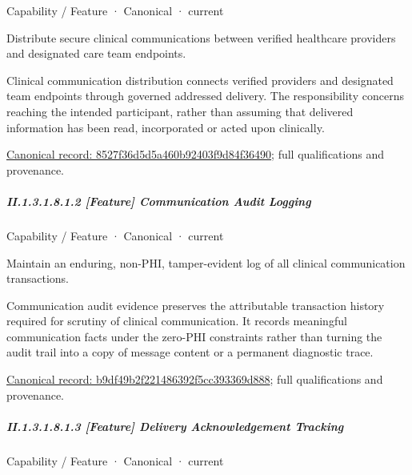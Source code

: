 \label{element:8527f36d5d5a460b92403f9d84f36490}
{\small Capability / Feature · Canonical · current}\par

Distribute secure clinical communications between verified healthcare providers and designated care team endpoints.



Clinical communication distribution connects verified providers and designated team endpoints through governed addressed delivery. The responsibility concerns reaching the intended participant, rather than assuming that delivered information has been read, incorporated or acted upon clinically.


{\footnotesize \href{../../../../continuum/strategy/capability/feature/8527f36d5d5a460b92403f9d84f36490.md}{Canonical record: 8527f36d5d5a460b92403f9d84f36490}; full qualifications and provenance.}\par
\subparagraph*{II.1.3.1.8.1.2 [Feature] Communication Audit Logging}
\label{navigation:II.1.3.1.8.1.2}

\label{element:b9df49b2f221486392f5cc393369d888}
{\small Capability / Feature · Canonical · current}\par

Maintain an enduring, non-PHI, tamper-evident log of all clinical communication transactions.



Communication audit evidence preserves the attributable transaction history required for scrutiny of clinical communication. It records meaningful communication facts under the zero-PHI constraints rather than turning the audit trail into a copy of message content or a permanent diagnostic trace.


{\footnotesize \href{../../../../continuum/strategy/capability/feature/b9df49b2f221486392f5cc393369d888.md}{Canonical record: b9df49b2f221486392f5cc393369d888}; full qualifications and provenance.}\par
\subparagraph*{II.1.3.1.8.1.3 [Feature] Delivery Acknowledgement Tracking}
\label{navigation:II.1.3.1.8.1.3}

\label{element:6884eb06bb794c5b8513b9b63d69af7e}
{\small Capability / Feature · Canonical · current}\par

